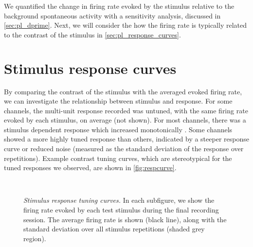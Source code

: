 We quantified the change in firing rate evoked by the stimulus relative to the background spontaneous activity with a sensitivity analysis, discussed in \autoref{sec:pl_dprime}.
Next, we will consider the how the firing rate is typically related to the contrast of the stimulus in \autoref{sec:pl_response_curves}.


\section{Stimulus response curves}
\label{sec:pl_response_curves}

By comparing the contrast of the stimulus with the averaged evoked firing rate, we can investigate the relationship between stimulus and response.
For some channels, the multi-unit response recorded was untuned, with the same firing rate evoked by each stimulus, on average (not shown).
For most channels, there was a stimulus dependent response which increased monotonically .
Some channels showed a more highly tuned response than others, indicated by a steeper response curve or reduced noise (measured as the standard deviation of the response over repetitions).
Example contrast tuning curves, which are stereotypical for the tuned responses we observed, are shown in \autoref{fig:respcurve}.


\begin{figure}[htbp]
    \centering
    \hspace*{\fill}
    \hspace{.4cm}
    \hspace*{\fill}
    \\
    \hspace*{\fill}
    \hspace{.4cm}
    \hspace*{\fill}
    \caption{\textit{Stimulus response tuning curves.}
    In each subfigure, we show the firing rate evoked by each test stimulus during the final recording session.
    The average firing rate is shown (black line), along with the standard deviation over all stimulus repetitions (shaded grey region).
}
    \label{fig:respcurve}
\end{figure}
